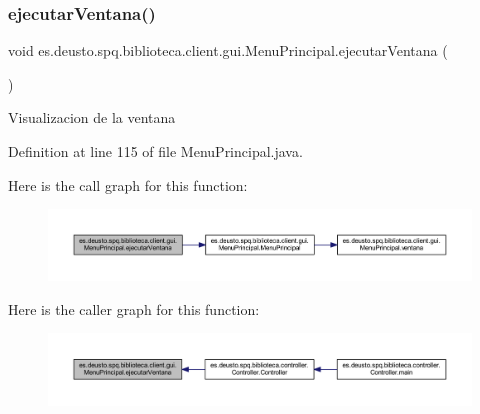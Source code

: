 \subsubsection{\texorpdfstring{ejecutar\+Ventana()}{ejecutarVentana()}}
{\footnotesize\ttfamily void es.\+deusto.\+spq.\+biblioteca.\+client.\+gui.\+Menu\+Principal.\+ejecutar\+Ventana (\begin{DoxyParamCaption}{ }\end{DoxyParamCaption})}

Visualizacion de la ventana 

Definition at line 115 of file Menu\+Principal.\+java.

Here is the call graph for this function\+:
\nopagebreak
\begin{figure}[H]
\begin{center}
\leavevmode
\includegraphics[width=350pt]{classes_1_1deusto_1_1spq_1_1biblioteca_1_1client_1_1gui_1_1_menu_principal_a8f37cacc1f9ccc9b65f768d1cb5bc9c8_cgraph}
\end{center}
\end{figure}
Here is the caller graph for this function\+:
\nopagebreak
\begin{figure}[H]
\begin{center}
\leavevmode
\includegraphics[width=350pt]{classes_1_1deusto_1_1spq_1_1biblioteca_1_1client_1_1gui_1_1_menu_principal_a8f37cacc1f9ccc9b65f768d1cb5bc9c8_icgraph}
\end{center}
\end{figure}
\mbox{\label{classes_1_1deusto_1_1spq_1_1biblioteca_1_1client_1_1gui_1_1_menu_principal_a6d0a1420be215523ce7195628b2c3002}} 
